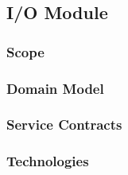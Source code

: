 \documentclass{article}
\begin{document}
	\subsection{I/O Module}
		\subsubsection{Scope}
		\subsubsection{Domain Model}
		\subsubsection{Service Contracts}
		\subsubsection{Technologies}
		
\end{document}
